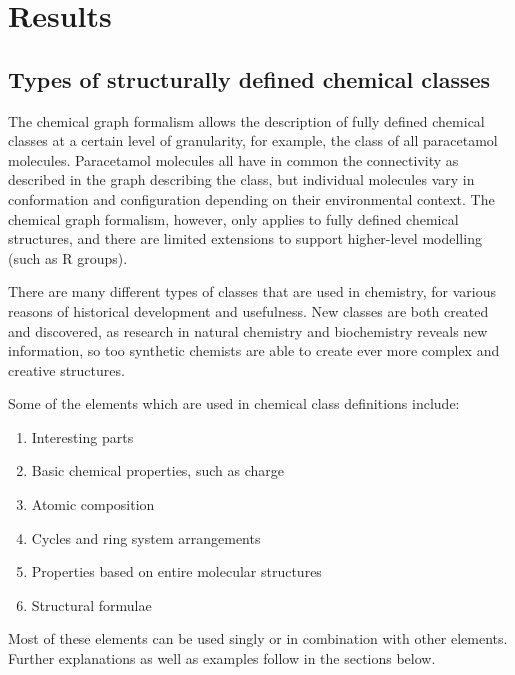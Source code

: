 \documentclass[10pt]{bmc_article}
\newenvironment{bmcformat}{\baselineskip20pt\sloppy\setboolean{publ}{false}}{\baselineskip20pt\sloppy}
\begin{document}
\begin{bmcformat}
 


\section*{Results}

\subsection*{Types of structurally defined chemical classes}
\label{sec:resultsclasses}

The chemical graph formalism \cite{trinajstic1992} allows the description of fully defined chemical classes at a certain level of granularity, for example, the class of all paracetamol molecules.  Paracetamol molecules all have in common the connectivity as described in the graph describing the class, but individual molecules vary in conformation and configuration depending on their environmental context. The chemical graph formalism, however, only applies to fully defined chemical structures, and there are limited extensions to support higher-level modelling (such as R groups). 

There are many different types of classes that are used in chemistry, for various reasons of historical development and usefulness. New classes are both created and discovered, as research in natural chemistry and biochemistry reveals new information, so too synthetic chemists are able to create ever more complex and creative structures.

Some of the elements which are used in chemical class definitions include: 
\begin{enumerate}
	\item	Interesting parts
	\item	Basic chemical properties, such as charge
	\item	Atomic composition
	\item	Cycles and ring system arrangements
	\item	Properties based on entire molecular structures
	\item	Structural formulae
\end{enumerate}

Most of these elements can be used singly or in combination with other elements.  Further explanations as well as examples follow in the sections below. 



\end{bmcformat}
\end{document}
